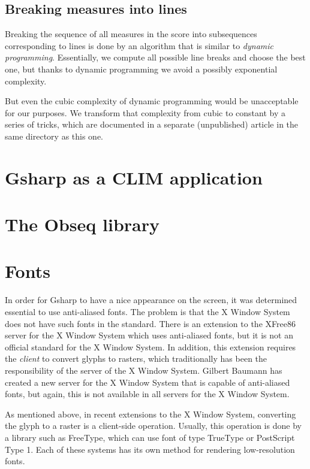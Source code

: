 \documentclass[11pt]{book}
\def\gs{Gsharp}
\def\obseq{Obseq}
\def\clim{CLIM}
\def\xwin{the X Window System}
\def\freetype{FreeType}
\begin{document}
\section{Breaking measures into lines}

Breaking the sequence of all measures in the score into subsequences
corresponding to lines is done by an algorithm that is similar to
\emph{dynamic programming}.  Essentially, we compute all possible line
breaks and choose the best one, but thanks to dynamic programming we
avoid a possibly exponential complexity.  

But even the cubic complexity of dynamic programming would be
unacceptable for our purposes.  We transform that complexity from
cubic to constant by a series of tricks, which are documented in a
separate (unpublished) article in the same directory as this one. 

\chapter{{\gs} as a {\clim} application}

\chapter{The {\obseq} library}

\chapter{Fonts}
\label{chap-fonts}

In order for {\gs} to have a nice appearance on the screen, it was
determined essential to use anti-aliased fonts.  The problem is that
{\xwin} does not have such fonts in the standard.  There is an
extension to the XFree86 server for {\xwin} which uses anti-aliased
fonts, but it is not an official standard for {\xwin}.  In addition,
this extension requires the \emph{client} to convert glyphs to
rasters, which traditionally has been the responsibility of the server
of {\xwin}.  Gilbert Baumann has created a new server for {\xwin} that
is capable of anti-aliased fonts, but again, this is not available in
all servers for {\xwin}.

As mentioned above, in recent extensions to {\xwin}, converting the
glyph to a raster is a client-side operation.  Usually, this operation
is done by a library such as {\freetype}, which can use font of type
TrueType or PostScript Type 1.  Each of these systems has its own
method for rendering low-resolution fonts.  
\end{document}
